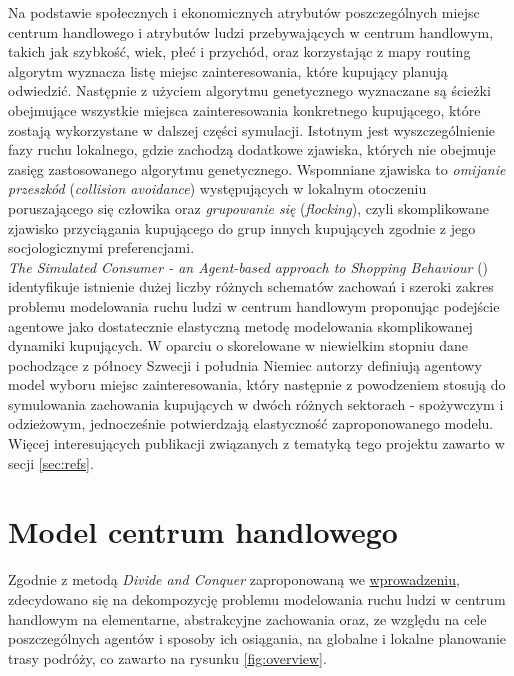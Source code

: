 \documentclass[a4paper, 12pt]{article}
\begin{document}
Na podstawie społecznych i ekonomicznych atrybutów poszczególnych miejsc centrum handlowego i atrybutów ludzi przebywających w centrum handlowym, takich jak szybkość, wiek, płeć i przychód, oraz korzystając z mapy routing algorytm wyznacza listę miejsc zainteresowania, które kupujący planują odwiedzić. Następnie z użyciem algorytmu genetycznego wyznaczane są ścieżki obejmujące wszystkie miejsca zainteresowania konkretnego kupującego, które zostają wykorzystane w dalszej części symulacji.
Istotnym jest wyszczególnienie fazy ruchu lokalnego, gdzie zachodzą dodatkowe zjawiska, których nie obejmuje zasięg zastosowanego algorytmu genetycznego. Wspomniane zjawiska to \emph{omijanie przeszkód} (\emph{collision avoidance}) występujących w lokalnym otoczeniu poruszającego się człowika oraz \emph{grupowanie się} (\emph{flocking}), czyli skomplikowane zjawisko przyciągania kupującego do grup innych kupujących zgodnie z jego socjologicznymi preferencjami. \\

\emph{The Simulated Consumer - an Agent-based approach to Shopping Behaviour} \linebreak (\cite{refs:real-data-2}) identyfikuje istnienie dużej liczby różnych schematów zachowań i szeroki zakres problemu modelowania ruchu ludzi w centrum handlowym proponując podejście agentowe jako dostatecznie elastyczną metodę modelowania skomplikowanej dynamiki kupujących. W oparciu o skorelowane w niewielkim stopniu dane pochodzące z północy Szwecji i południa Niemiec autorzy definiują agentowy model wyboru miejsc zainteresowania, który następnie z powodzeniem stosują do symulowania zachowania kupujących w dwóch różnych sektorach - spożywczym i odzieżowym, jednocześnie potwierdzają elastyczność zaproponowanego modelu. \\

Więcej interesujących publikacji związanych z tematyką tego projektu zawarto w secji \ref{sec:refs}.

\newpage
    \section{Model centrum handlowego}
    \label{sec:mall-model}

\noindent
Zgodnie z metodą \emph{Divide and Conquer} zaproponowaną we \hyperref[sec:intro]{wprowadzeniu}, zdecydowano się na dekompozycję problemu modelowania ruchu ludzi w centrum handlowym na elementarne, abstrakcyjne zachowania oraz, ze względu na cele poszczególnych agentów i sposoby ich osiągania, na globalne i lokalne planowanie trasy podróży, co zawarto na rysunku \ref{fig:overview}.
\end{document}
